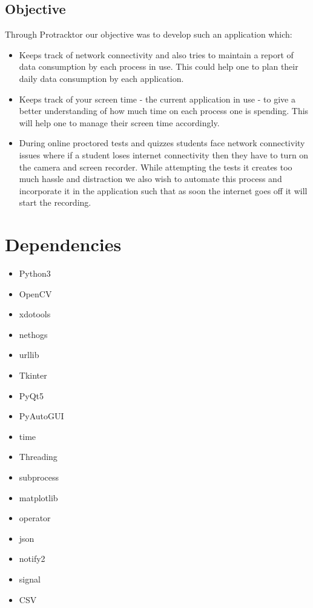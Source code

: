 \documentclass{article}
\begin{document}
\subsection{Objective}
Through Protracktor our objective was to develop such an application which:
\begin{itemize}
    \item Keeps track of network connectivity and also tries to maintain a report of data consumption by each process in use. This could help one to plan their daily data consumption by each application.
    \item Keeps track of your screen time - the current application in use - to give a better understanding of how much time on each process one is spending. This will help one to manage their screen time accordingly.
    \item During online proctored tests and quizzes students face network connectivity issues where if a student loses internet connectivity then they have to turn on the camera and screen recorder. While attempting the tests it creates too much hassle and distraction we also wish to automate this process and incorporate it in the application such that as soon the internet goes off it will start the recording.
\end{itemize}


\section{Dependencies}
\begin{itemize}
    \item Python3
    \item OpenCV
    \item xdotools
    \item nethogs
    \item urllib
    \item Tkinter
    \item PyQt5
    \item PyAutoGUI
    \item time
    \item Threading
    \item subprocess
    \item matplotlib
    \item operator
    \item json
    \item notify2
    \item signal
    \item CSV
\end{itemize}
\end{document}
